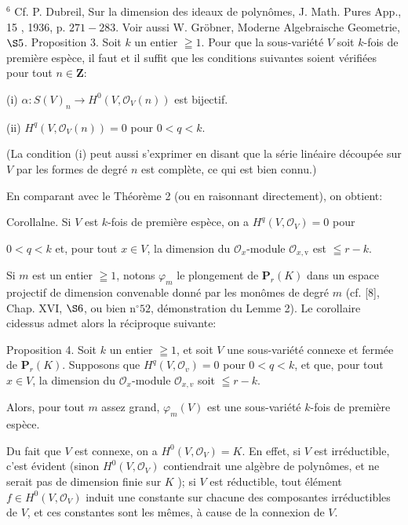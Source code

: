 ${ }^{6}$ Cf. P. Dubreil, Sur la dimension des ideaux de polynômes, J. Math. Pures App., 15 , 1936, p. $271-283$. Voir aussi W. Gröbner, Moderne Algebraische Geometrie, $\S 5$. Proposition 3. Soit $k$ un entier $\geqq 1 .$ Pour que la sous-variété $V$ soit $k$-fois de première espèce, il faut et il suffit que les conditions suivantes soient vérifiées pour tout $n \in \mathbf{Z}:$

(i) $\alpha: S(V)_{n} \rightarrow H^{0}\left(V, \mathcal{O}_{V}(n)\right)$ est bijectif.

(ii) $H^{q}\left(V, \mathcal{O}_{V}(n)\right)=0$ pour $0<q<k$.

(La condition (i) peut aussi s'exprimer en disant que la série linéaire découpée sur $V$ par les formes de degré $n$ est complète, ce qui est bien connu.)

En comparant avec le Théorème 2 (ou en raisonnant directement), on obtient:

Corollalne. Si $V$ est $k$-fois de première espèce, on a $H^{q}\left(V, \mathcal{O}_{V}\right)=0$ pour

$0<q<k$ et, pour tout $x \in V$, la dimension du $\mathcal{O}_{x}$-module $\mathcal{O}_{x, \mathrm{v}}$ est $\leqq r-k$.

Si $m$ est un entier $\geqq 1$, notons $\varphi_{m}$ le plongement de $\mathbf{P}_{r}(K)$ dans un espace projectif de dimension convenable donné par les monômes de degré $m$ (cf. [8], Chap. XVI, $\S 6$, ou bien $\mathrm{n}^{\circ} 52$, démonstration du Lemme 2). Le corollaire cidessus admet alors la réciproque suivante:

Proposition 4. Soit $k$ un entier $\geqq 1$, et soit $V$ une sous-variété connexe et fermée de $\mathbf{P}_{r}(K)$. Supposons que $H^{q}\left(V, \mathcal{O}_{v}\right)=0$ pour $0<q<k$, et que, pour tout $x \in V$, la dimension du $\mathcal{O}_{x}$-module $\mathcal{O}_{x, v}$ soit $\leqq r-k$.

Alors, pour tout $m$ assez grand, $\varphi_{m}(V)$ est une sous-variété $k$-fois de première espèce.

Du fait que $V$ est connexe, on a $H^{0}\left(V, \mathcal{O}_{V}\right)=K .$ En effet, si $V$ est irréductible, c'est évident (sinon $H^{0}\left(V, \mathcal{O}_{V}\right)$ contiendrait une algèbre de polynômes, et ne serait pas de dimension finie sur $K$ ); si $V$ est réductible, tout élément $f \in H^{0}\left(V, \mathcal{O}_{V}\right)$ induit une constante sur chacune des composantes irréductibles de $V$, et ces constantes sont les mêmes, à cause de la connexion de $V$.

